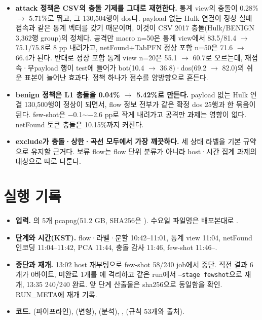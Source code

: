 \begin{itemize}
\item \textbf{attack 정책은 CSV의 충돌 기제를 그대로 재현한다.} 통계 view의 충돌이 0.28\% $\to$ 5.71\%로 뛰고, 그 130,504행이 dos다. payload 없는 Hulk 연결이 정상 실패 접속과 같은 통계 벡터를 갖기 때문이며, 이것이 CSV 2017 충돌(Hulk/BENIGN 3,362행 group)의 정체다. 공격만 macro n=50은 통계 view에서 83.5/81.4 $\to$ 75.1/75.8로 8 pp 내려가고, netFound+TabPFN 정상 포함 n=50은 71.6 $\to$ 66.4가 된다. 반대로 정상 포함 통계 view n=20은 55.1 $\to$ 60.7로 오르는데, 재접속·무payload 행이 test에 들어가 bot(10.4 $\to$ 36.8)·dos(69.2 $\to$ 82.0)의 쉬운 표본이 늘어난 효과다. 정책 하나가 점수를 양방향으로 흔든다.
\item \textbf{benign 정책은 L1 충돌을 0.04\% $\to$ 5.42\%로 만든다.} payload 없는 Hulk 연결 130,500행이 정상이 되면서, flow 정보 전부가 같은 확정 dos 25행과 한 묶음이 된다. few-shot은 $-$0.1$\sim$$-$2.6 pp로 작게 내려가고 공격만 과제는 영향이 없다. netFound 토큰 충돌은 10.15\%까지 커진다.
\item \textbf{exclude가 충돌·상한·곡선 모두에서 가장 깨끗하다.} 세 상태 라벨을 기본 규약으로 유지할 근거다. 보류 flow는 flow 단위 분류가 아니라 host·시간 집계 과제의 대상으로 따로 다룬다.
\end{itemize}

\section{실행 기록}
\begin{itemize}
\item \textbf{입력.} 의 5개 pcapng(51.2 GB, SHA256은 ). 수요일 파일명은 배포본대로 .
\item \textbf{단계와 시간(KST).} flow·라벨·분할 10:42--11:01, 통계 view 11:04, netFound 인코딩 11:04--11:42, PCA 11:44, 충돌 감사 11:46, few-shot 11:46--.
\item \textbf{중단과 재개.} 13:02 host 재부팅으로 few-shot 58/240 job에서 중단. 직전 결과 6개가 0바이트, 미완료 1개를 에 격리하고 같은 run에서 \texttt{--stage fewshot}으로 재개, 13:35 240/240 완료. 앞 단계 산출물은 sha256으로 동일함을 확인. RUN\_META에 재개 기록.
\item \textbf{코드.} (파이프라인), (변형), (분석), , (규칙 53개와 출처).
\end{itemize}

